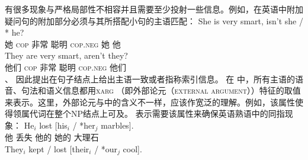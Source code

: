 有很多现象与严格局部性不相容并且需要至少投射一些信息。例如，在英语中附加疑问句的附加部分必须与其所搭配小句的主语匹配：
\eal
\ex 
\gll She is very smart, isn't she / * he?\\
     她 \textsc{cop} 非常 聪明 \textsc{cop}.\textsc{neg} 她 {} {} 他\\
\ex 
\gll They are very smart, aren't they?\\
     他们 \textsc{cop} 非常 聪明 \textsc{cop}.\textsc{neg} 他们\\
\zl
 \citet{BF99a}、 \citet{FB2003a}因此提出在句子结点上给出主语一致或者指称索引信息。 在 \citet{Sag2007a}中，所有主语的语音、句法和语义信息都用\textsc{xarg} （即外部论元（\textsc{external argument}））特征的取值来表示。这里，外部论元与\gbtc 中的含义不一样，应该作宽泛的理解。例如，该属性使得领属代词在整个NP结点上可及。 \citet{Sag2007a}表示需要该属性来确保英语熟语中的同指现象：
\eal
\ex 
\gll He$_i$ lost [his$_i$ / *her$_j$ marbles].\\
     他      丢失 \spacebr{}他的 {} 她的 大理石\\
\ex 
\gll They$_i$ kept / lost [their$_i$ / *our$_j$ cool].\\
